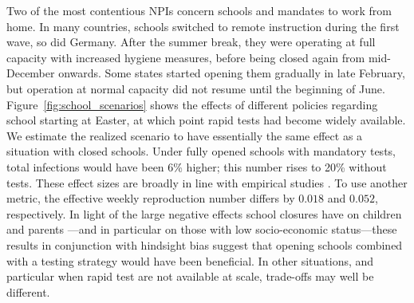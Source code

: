 Two of the most contentious NPIs concern schools and mandates to work from home. In many
countries, schools switched to remote instruction during the first wave, so did Germany.
After the summer break, they were operating at full capacity with increased hygiene
measures, before being closed again from mid-December onwards. Some states started
opening them gradually in late February, but operation at normal capacity did not resume
until the beginning of June. Figure~\ref{fig:school_scenarios} shows the effects of
different policies regarding school starting at Easter, at which point rapid tests had
become widely available. We estimate the realized scenario to have essentially the same
effect as a situation with closed schools. Under fully opened schools with mandatory
tests, total infections would have been 6\% higher; this number rises to 20\% without
tests. These effect sizes are broadly in line with empirical studies
\citep[e.g.,][]{Vlachos2021}.  To use
another metric, the effective weekly reproduction number differs by $0.018$ and $0.052$,
respectively. In light of the large negative effects school closures have on children
and parents \citep{Luijten2021, Melegari2021}---and in particular on those with low
socio-economic status---these results in conjunction with hindsight bias suggest that
opening schools combined with a testing strategy would have been beneficial. In other
situations, and particular when rapid test are not available at scale, trade-offs may
well be different.


